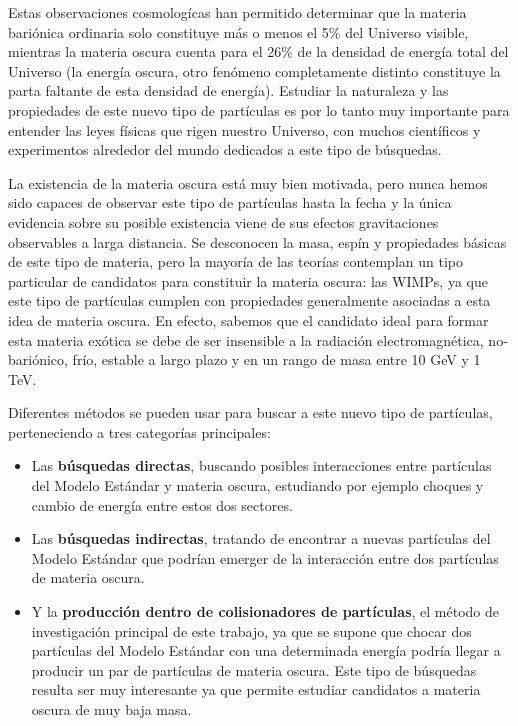 \documentclass[a4paper, 10pt, openright]{report}
\begin{document}
\begin{appendices}
Estas observaciones cosmolog\'{i}cas han permitido determinar que la materia bari\'{o}nica ordinaria solo constituye m\'{a}s o menos el 5\% del Universo visible, mientras la materia oscura cuenta para el 26\% de la densidad de energ\'{i}a total del Universo (la energ\'{i}a oscura, otro fen\'{o}meno completamente distinto constituye la parta faltante de esta densidad de energ\'{i}a). Estudiar la naturaleza y las propiedades de este nuevo tipo de part\'{i}culas es por lo tanto muy importante para entender las leyes f\'{i}sicas que rigen nuestro Universo, con muchos cient\'{i}ficos y experimentos alrededor del mundo dedicados a este tipo de b\'{u}squedas.

La existencia de la materia oscura est\'{a} muy bien motivada, pero nunca hemos sido capaces de observar este tipo de part\'{i}culas hasta la fecha y la \'{u}nica evidencia sobre su posible existencia viene de sus efectos gravitaciones observables a larga distancia. Se desconocen la masa, esp\'{i}n y propiedades b\'{a}sicas de este tipo de materia, pero la mayor\'{i}a de las teor\'{i}as contemplan un tipo particular de candidatos para constituir la materia oscura: las \acp{WIMP}, ya que este tipo de part\'{i}culas cumplen con propiedades generalmente asociadas a esta idea de materia oscura. En efecto, sabemos que el candidato ideal para formar esta materia ex\'{o}tica se debe de ser insensible a la radiaci\'{o}n electromagn\'{e}tica, no-bari\'{o}nico, fr\'{i}o, estable a largo plazo y en un rango de masa entre 10 GeV y 1 TeV.

Diferentes m\'{e}todos se pueden usar para buscar a este nuevo tipo de part\'{i}culas, perteneciendo a tres categor\'{i}as principales:
\begin{itemize}
\item Las \textbf{b\'{u}squedas directas}, buscando posibles interacciones entre part\'{i}culas del Modelo Est\'{a}ndar y materia oscura, estudiando por ejemplo choques y cambio de energ\'{i}a entre estos dos sectores.
\item Las \textbf{b\'{u}squedas indirectas}, tratando de encontrar a nuevas part\'{i}culas del Modelo Est\'{a}ndar que podr\'{i}an emerger de la interacci\'{o}n entre dos part\'{i}culas de materia oscura.
\item Y la \textbf{producci\'{o}n dentro de colisionadores de part\'{i}culas}, el m\'{e}todo de investigaci\'{o}n principal de este trabajo, ya que se supone que chocar dos part\'{i}culas del Modelo Est\'{a}ndar con una determinada energ\'{i}a podr\'{i}a llegar a producir un par de part\'{i}culas de materia oscura. Este tipo de b\'{u}squedas resulta ser muy interesante ya que permite estudiar candidatos a materia oscura de muy baja masa.
\end{itemize}


\end{appendices}
\end{document}
